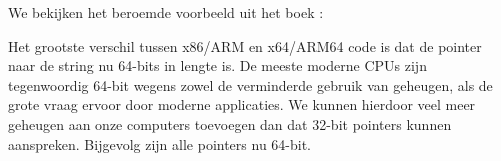 \chapterold{\HelloWorldSectionName}
\label{sec:helloworld}

We bekijken het beroemde voorbeeld uit het boek \KRBook:














\sectionold{\Conclusion{}}

Het grootste verschil tussen x86/ARM en x64/ARM64 code is dat de pointer naar de string nu 64-bits in lengte is.
De meeste moderne \ac{CPU}s zijn tegenwoordig 64-bit wegens zowel de verminderde gebruik van geheugen, als de grote vraag ervoor door moderne applicaties.
We kunnen hierdoor veel meer geheugen aan onze computers toevoegen dan dat 32-bit pointers kunnen aanspreken.
Bijgevolg zijn alle pointers nu 64-bit.


